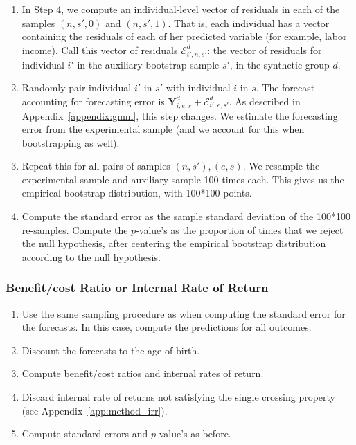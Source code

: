 \begin{enumerate}
\item In Step 4, we compute an individual-level vector of residuals in each of the samples $(n,s',0)$ and $(n,s',1)$. That is, each individual has a vector containing the residuals of each of her predicted variable (for example, labor income). Call this vector of residuals $\bm{\mathcal{E}}_{i',n,s'}^d$: the vector of residuals for individual $i'$ in the auxiliary bootstrap sample $s'$, in the synthetic group $d$.

\item Randomly pair individual $i'$ in $s'$ with individual $i$ in $s$. The forecast accounting for forecasting error is $\bm{Y}_{i,e,s}^d + \bm{\mathcal{E}}_{i',e,s'}^d$. As described in Appendix~\ref{appendix:gmm}, this step changes. We estimate the forecasting error from the experimental sample (and we account for this when bootstrapping as well).

\item Repeat this for all pairs of samples $(n,s'), (e,s)$. We resample the experimental sample and auxiliary sample 100 times each. This gives us the empirical bootstrap distribution, with 100*100 points.

\item Compute the standard error as the sample standard deviation of the 100*100 re-samples. Compute the $p$-value's as the proportion of times that we reject the null hypothesis, after centering the empirical bootstrap distribution according to the null hypothesis.

\end{enumerate}

\subsubsection{Benefit/cost Ratio or Internal Rate of Return}

\begin{enumerate}

\item Use the same sampling procedure as when computing the standard error for the forecasts. In this case, compute the predictions for all outcomes.
\item Discount the forecasts to the age of birth.
\item Compute benefit/cost ratios and internal rates of return.
\item Discard internal rate of returns not satisfying the single crossing property (see Appendix~\ref{app:method_irr}).
\item Compute standard errors and $p$-value's as before.

\end{enumerate}


